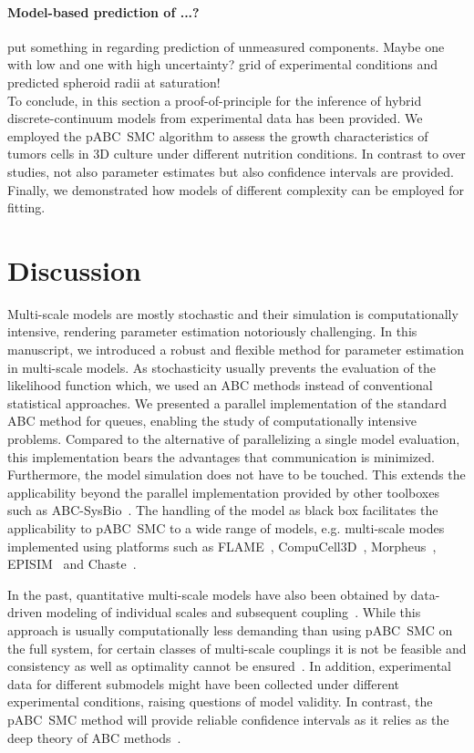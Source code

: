 \documentclass[10pt,letterpaper]{article}
\newcommand{\jh}[1]{{\color{red}#1}}
\newcommand{\nj}[1]{{\color{blue}#1}}
\begin{document}
\paragraph*{Model-based prediction of ...?}
\jh{put something in regarding prediction of unmeasured components. Maybe one with low and one with high uncertainty?} \nj{grid of experimental conditions and predicted spheroid radii at saturation!}
\\[2ex]
\noindent To conclude, in this section a proof-of-principle for the inference of hybrid discrete-continuum models from experimental data has been provided. We employed the pABC~SMC algorithm to assess the growth characteristics of tumors cells in 3D culture under different nutrition conditions. In contrast to over studies, not also parameter estimates but also confidence intervals are provided. Finally, we demonstrated how models of different complexity can be employed for fitting.

\section*{Discussion}

Multi-scale models are mostly stochastic and their simulation is computationally intensive, rendering parameter estimation notoriously challenging. In this manuscript, we introduced a robust and flexible method for parameter estimation in multi-scale models. As stochasticity usually prevents the evaluation of the likelihood function which, we used an ABC methods instead of conventional statistical approaches. We presented a parallel implementation of the standard ABC method for queues, enabling the study of computationally intensive problems. Compared to the alternative of parallelizing a single model evaluation, this implementation bears the advantages that communication is minimized. Furthermore, the model simulation does not have to be touched. This extends the applicability beyond the parallel implementation provided by other toolboxes such as ABC-SysBio~\cite{LiepeBar2010}. The handling of the model as black box facilitates the applicability to pABC~SMC to a wide range of models, e.g. multi-scale modes implemented using platforms such as FLAME~\cite{RichmondWal2010}, CompuCell3D~\cite{SwatTho2012}, Morpheus~\cite{StarrussBac2014}, EPISIM~\cite{SutterlinKol2013} and Chaste~\cite{MiramsArt2013}.

In the past, quantitative multi-scale models have also been obtained by data-driven modeling of individual scales and subsequent coupling~\cite{tenTusscherNob2004,HayengaTho2011,ChewWen2014}. While this approach is usually computationally less demanding than using pABC~SMC on the full system, for certain classes of multi-scale couplings it is not be feasible and consistency as well as optimality cannot be ensured~\cite{HasenauerJag2015}. In addition, experimental data for different submodels might have been collected under different experimental conditions, raising questions of model validity. In contrast, the pABC~SMC method will provide reliable confidence intervals as it relies as the deep theory of ABC methods~\cite{MarjoramMol2003,SissonFan2007,ToniWel2009}.
\end{document}
